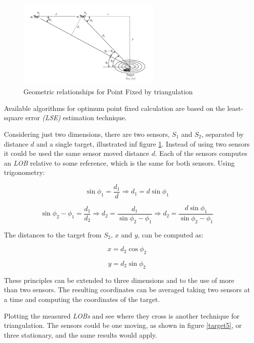 \documentclass[english,purist]{ist-report}
\begin{document}
\begin{figure}[ht]
\centering
\includegraphics[width=70mm]{target4.png}
\caption{Geometric relationships for Point Fixed by triangulation}
\label{target4}
\end{figure} 


Available algorithms for optimum point fixed calculation are based on the least-square error \textit{(LSE)} estimation technique.

Considering just two dimensions, there are two sensors, $S_1$ and $S_2$, separated by distance $d$ and a single target, illustrated inf figure \ref{target4}. Instead of using two sensors it could be used the same sensor moved distance $d$. Each of the sensors computes an \textit{LOB} relative to some reference, which is the same for both sensors. Using trigonometry: 

\begin{equation*}
    \sin{\phi_1} = \frac{d_1}{d} \Rightarrow 
    d_1 = d \sin{\phi_1}
\end{equation*}

\begin{equation*}
\sin{\phi_2 - \phi_1} = \frac{d_1}{d_2} \Rightarrow d_2 = \frac{d_1}{\sin{\phi_2 - \phi_1}} \Rightarrow d_2 = \frac{d \sin{\phi_1}}{\sin{\phi_2 - \phi_1}}     
\end{equation*}

The distances to the target from $S_2$, $x$ and $y$, can be computed as:

\begin{equation*}
x = d_2 \cos{\phi_2}     
\end{equation*}

\begin{equation*}
y = d_2 \sin{\phi_2}     
\end{equation*}

These principles can be extended to three dimensions and to the use of more than two sensors. The resulting coordinates can be averaged taking two sensors at a time and computing the coordinates of the target.

Plotting the measured \textit{LOBs} and see where they cross is another technique for triangulation. The sensors could be one moving, as shown in figure \ref{target5}, or three stationary, and the same results would apply.
\end{document}
